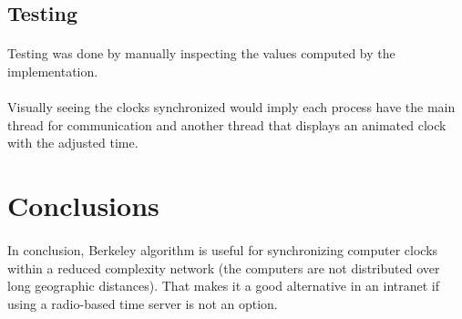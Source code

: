 \documentclass[12pt]{article}
\begin{document}
\subsection{Testing}
\paragraph{}
Testing was done by manually inspecting the values computed by the implementation.

\paragraph{}
Visually seeing the clocks synchronized would imply each process have the main thread for communication and another thread that displays an animated clock with the adjusted time.

\section{Conclusions}
\paragraph{}
In conclusion, Berkeley algorithm is useful for synchronizing computer clocks within a reduced complexity network (the computers are not distributed over long geographic distances). That makes it a good alternative in an intranet if using a radio-based time server is not an option.

\printbibliography
\end{document}
